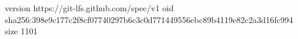version https://git-lfs.github.com/spec/v1
oid sha256:398e9c177c2f8cf07740297b6c3c0d771449556ebc89b4119e82c2a3d16fc994
size 1101
